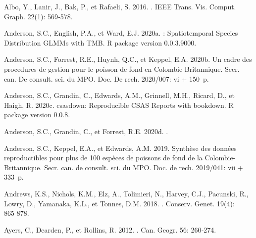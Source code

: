 \documentclass[french,11pt]{book}
\begin{document}
\hypertarget{refs}{}
\begin{CSLReferences}{1}{0}
%
Albo, Y., Lanir, J., Bak, P., et Rafaeli, S. 2016. . IEEE Trans. Vis. Comput. Graph. 22(1): 569‑578.

%
Anderson, S.C., English, P.A., et Ward, E.J. 2020a. : Spatiotemporal Species Distribution GLMMs with {TMB}. R package version 0.0.3.9000.

%
Anderson, S.C., Forrest, R.E., Huynh, Q.C., et Keppel, E.A. 2020b. Un cadre des procedures de gestion pour le poisson de fond en {Colombie-Britannique}. Secr. can. De consult. sci. du MPO. Doc. De rech. 2020/007: vi + 150~p.

%
Anderson, S.C., Grandin, C., Edwards, A.M., Grinnell, M.H., Ricard, D., et Haigh, R. 2020c. {csasdown}: Reproducible {CSAS} Reports with bookdown. R package version 0.0.8.

%
Anderson, S.C., Grandin, C., et Forrest, R.E. 2020d. .

%
Anderson, S.C., Keppel, E.A., et Edwards, A.M. 2019. Synthèse des données reproductibles pour plus de 100 espèces de poissons de fond de la {Colombie-Britannique}. Secr. can. de consult. sci. du MPO. Doc. de rech. 2019/041: vii + 333~p.

%
Andrews, K.S., Nichols, K.M., Elz, A., Tolimieri, N., Harvey, C.J., Pacunski, R., Lowry, D., Yamanaka, K.L., et Tonnes, D.M. 2018. . Conserv. Genet. 19(4): 865‑878.

%
Ayers, C., Dearden, P., et Rollins, R. 2012. . Can. Geogr. 56: 260‑274.


\end{CSLReferences}
\end{document}
